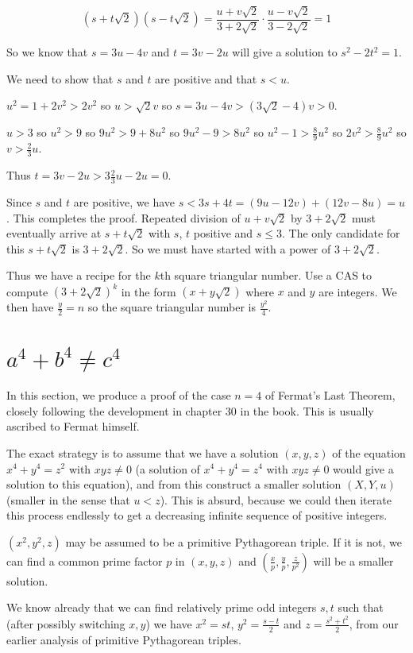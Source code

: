 \documentclass[12pt]{article}
\begin{document}
$$(s+t\sqrt 2)(s-t \sqrt 2) = \frac{u+v\sqrt2}{3+2\sqrt2}\cdot\frac{u-v\sqrt2}{3-2\sqrt2}  = 1$$

So we know that $s=3u-4v$ and $t=3v-2u$  will give a solution to $s^2-2t^2=1$.

We need to show that $s$ and $t$ are positive and that $s<u$.

$u^2=1+2v^2>2v^2$ so $u>\sqrt2v$ so $s=3u-4v>(3\sqrt2 -4)v>0$.

$u>3$ so $u^2>9$ so $9u^2>9+8u^2$ so $9u^2-9>8u^2$ so $u^2-1>\frac89u^2$ so $2v^2>\frac89u^2$ so $v>\frac23u$.

Thus $t=3v-2u>3\frac23u-2u=0$.

Since $s$ and $t$ are positive, we have $s<3s+4t=(9u-12v)+(12v-8u)=u$.  This completes the proof.  Repeated division of $u+v\sqrt 2$ by $3+2\sqrt 2$ must eventually arrive at $s+t\sqrt 2$ with $s$, $t$ positive and $s \leq 3$.  The
only candidate for this $s+t\sqrt 2$ is $3 + 2\sqrt 2$.  So we must have started with a power of $3+2\sqrt 2$.

Thus we have a recipe for the $k$th square triangular number.   Use a CAS to compute $(3+2\sqrt2)^k$ in the form
$(x+y\sqrt2)$ where $x$ and $y$ are integers.  We then have $\frac y2= n$ so the square triangular number is
$\frac {y^2}4$.

\newpage

\section{$a^4+b^4 \neq c^4$}

In this section, we produce a proof of the case $n=4$ of Fermat's Last Theorem, closely following the development in chapter 30 in the book.   This is usually ascribed to Fermat himself. 

The exact strategy is to assume that we have a solution $(x,y,z)$ of the equation $x^4+y^4=z^2$ with $xyz \neq 0$
(a solution of $x^4+y^4=z^4$ with $xyz \neq 0$ would give a solution to this equation), and from this construct a smaller solution
$(X,Y,u)$ (smaller in the sense that $u<z$).   This is absurd, because we could then iterate this process endlessly to get a decreasing infinite sequence of positive integers.

$(x^2,y^2,z)$ may be assumed to be a primitive Pythagorean triple.   If it is not, we can find a common prime factor $p$ in
$(x,y,z)$ and $(\frac xp,\frac yp, \frac z{p^2})$ will be a smaller solution.

We know already that we can find relatively prime odd integers $s,t$ such that (after possibly switching $x,y$) we have $x^2=st$, $y^2=\frac{s-t}2$
and $z=\frac{s^2+t^2}2$, from our earlier analysis of primitive Pythagorean triples.
\end{document}
